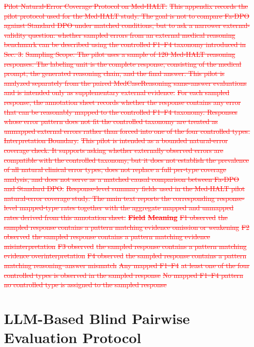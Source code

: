 \documentclass[a4paper,fleqn,doubleblind]{cas-sc}
\DeclareRobustCommand{\deleted}[1]{\textcolor{red}{\sout{#1}}}
\begin{document}
\deleted{Pilot Natural-Error Coverage Protocol on Med-HALT.}
\deleted{This appendix records the pilot protocol used for the Med-HALT study. The goal is not to compare Fa-DPO against Standard DPO under matched conditions, but to ask a narrower external-validity question: whether sampled errors from an external medical reasoning benchmark can be described using the controlled F1--F4 taxonomy introduced in Sec. 3.}
\deleted{Sampling Scope. The pilot uses a sample of 120 Med-HALT reasoning responses. The labeling unit is the complete response, consisting of the medical prompt, the generated reasoning chain, and the final answer. This pilot is analyzed separately from the paired MedCaseReasoning same-answer evaluations and is intended only as supplementary external evidence.}
\deleted{For each sampled response, the annotation sheet records whether the response contains any error that can be reasonably mapped to the controlled F1--F4 taxonomy. Responses whose error pattern does not fit the controlled taxonomy are treated as unmapped external errors rather than forced into one of the four controlled types.}
\deleted{Interpretation Boundary.}
\deleted{This pilot is intended as a bounded natural-error coverage check. It supports asking whether externally observed errors are compatible with the controlled taxonomy, but it does not establish the prevalence of all natural clinical error types, does not replace a full per-type coverage analysis, and does not serve as a matched causal comparison between Fa-DPO and Standard DPO.}
\deleted{Response-level summary fields used in the Med-HALT pilot natural-error coverage study. The main text reports the corresponding response-level mapped-type rates together with the aggregate mapped and unmapped rates derived from this annotation sheet.}
\deleted{\textbf{Field}}
\deleted{\textbf{Meaning}}
\deleted{F1 observed}
\deleted{the sampled response contains a pattern matching evidence omission or weakening}
\deleted{F2 observed}
\deleted{the sampled response contains a pattern matching evidence misinterpretation}
\deleted{F3 observed}
\deleted{the sampled response contains a pattern matching evidence overinterpretation}
\deleted{F4 observed}
\deleted{the sampled response contains a pattern matching reasoning--answer mismatch}
\deleted{Any mapped F1--F4}
\deleted{at least one of the four controlled types is observed in the sampled response}
\deleted{No mapped F1--F4 pattern}
\deleted{no controlled type is assigned to the sampled response}

\section{LLM-Based Blind Pairwise Evaluation Protocol}
\label{app:gpt4_protocol}
\end{document}
